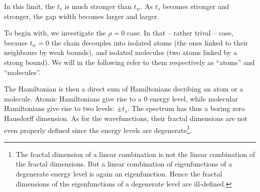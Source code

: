 \documentclass[11pt]{article}
\begin{document}
In this limit, the $t_s$ is much stronger than $t_w$.
As $t_s$ becomes stronger and stronger, the gap width becomes larger and larger. 

To begin with, we investigate the $\rho = 0$ case. 
In that -- rather trival -- case, because $t_w = 0$ the chain decouples into isolated atoms (the ones linked to their neighbours by weak bounds), and isolated molecules (two atoms linked by a strong bound). We will in the following refer to them respectively as ``atoms'' and ``molecules''.

The Hamiltonian is then a direct sum of Hamiltonians decribing an atom or a molecule. Atomic Hamiltonians give rise to a $0$ energy level, while molecular Hamiltonians give rise to two levels: $\pm t_s$.
The spectrum has thus a boring zero Hausdorff dimension. As for the wavefunctions, their fractal dimensions are not even properly defined since the energy levels are degenerate\footnote{The fractal dimension of a linear combination is not the linear combination of the fractal dimensions. But a linear combination of eigenfunctions of a degenerate energy level is again an eigenfunction. Hence the fractal dimensions of the eigenfunctions of a degenerate level are ill-defined.}.
\end{document}
